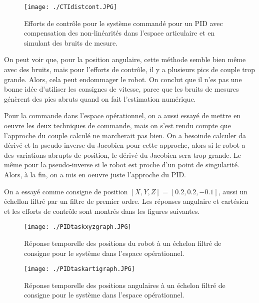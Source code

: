 \begin{figure}[H]
	\begin{center}	
		\texttt{[image: ./CTIdistcont.JPG]}
		\caption{Efforts de contrôle pour le système commandé pour un PID avec compensation des non-linéarités dans l'espace articulaire et en simulant des bruits de mesure.}
		\label{fig:CTIdistcont}
	\end{center}
\end{figure}

On peut voir que, pour la position angulaire, cette méthode semble bien même avec des bruits, mais pour l'efforts de contrôle, il y a plusieurs pics de couple trop grande. Alors, cela peut endommager le robot. On conclut que il n'es pas une bonne idée d'utiliser les consignes de vitesse, parce que les bruits de mesures génèrent des pics abruts quand on fait l'estimation numérique.

Pour la commande dans l'espace opérationnel, on a aussi essayé de mettre en oeuvre les deux techniques de commande, mais on s'est rendu compte que l'approche du couple calculé ne marcherait pas bien. On a besoinde calculer da dérivé et la pseudo-inverse du Jacobien pour cette approche, alors si le robot a des variations abrupts de position, le dérivé du Jacobien sera trop grande. Le même pour la pseudo-inverse si le robot est proche d'un point de singularité. Alors, à la fin, on a mis en oeuvre juste l'approche du PID.

On a essayé comme consigne de position $ \left[X,Y,Z\right] $ = $ \left[0.2, 0.2, -0.1\right] $, aussi un échellon filtré par un filtre de premier ordre. Les réponses angulaire et cartésien et les efforts de contrôle sont montrés dans les figures suivantes.


\begin{figure}[H]
	\begin{center}	
		\texttt{[image: ./PIDtaskxyzgraph.JPG]}
		\caption{Réponse temporelle des positions du robot à un échelon filtré de consigne pour le système dans l'espace opérationnel.}
		\label{fig:PIDtaskxyzgraph}
	\end{center}
\end{figure}

\begin{figure}[H]
	\begin{center}	
		\texttt{[image: ./PIDtaskartigraph.JPG]}
		\caption{Réponse temporelle des positions angulaires à un échelon filtré de consigne pour le système dans l'espace opérationnel.}
		\label{fig:PIDtaskartigraph}
	\end{center}
\end{figure}

